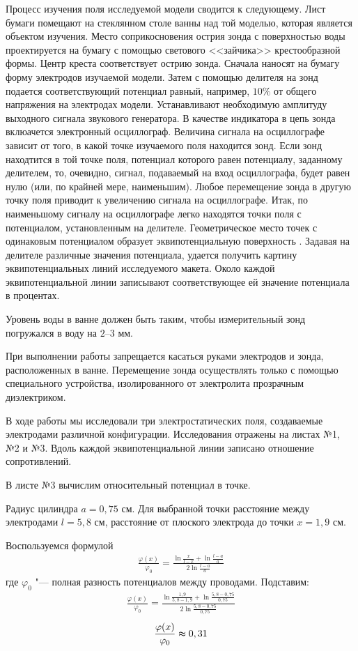 Процесс изучения поля исследуемой модели сводится к следующему. Лист бумаги помещают на стеклянном столе ванны над той моделью, которая является объектом изучения. Место соприкосновения острия зонда с поверхностью воды проектируется на бумагу с помощью светового <<зайчика>> крестообразной формы. Центр креста соответствует острию зонда. Сначала наносят на бумагу форму электродов изучаемой модели. Затем с помощью делителя на зонд подается соответствующий потенциал равный, например, $10\%$ от общего напряжения на электродах модели. Устанавливают необходимую амплитуду выходного сигнала звукового генератора. В качестве индикатора в цепь зонда вклюачется электронный осциллограф. Величина сигнала на осциллографе зависит от того, в какой точке изучаемого поля находится зонд. Если зонд находтится в той точке поля, потенциал которого равен потенциалу, заданному делителем, то, очевидно, сигнал, подаваемый на вход осциллографа, будет равен нулю (или, по крайней мере, наименьшим). Любое перемещение зонда в другую точку поля приводит к увеличению сигнала на осциллографе. Итак, по наименьшому сигналу на осциллографе легко находятся точки поля с потенциалом, установленным на делителе. Геометрическое место точек с одинаковым потенциалом образует эквипотенциальную поверхность . Задавая на делителе различные значения потенциала, удается получить картину эквипотенциальных линий исследуемого макета. Около каждой эквипотенциальной линии записывают соответствующее ей значение потенциала в процентах.

Уровень воды в ванне должен быть таким, чтобы измерительный зонд погружался в воду на $2$--$3$ мм.

При выполнении работы запрещается касаться руками электродов и зонда, расположенных в ванне. Перемещение зонда осуществлять только с помощью специального устройства, изолированного от электролита прозрачным диэлектриком.

В ходе работы мы исследовали три электростатических поля, создаваемые электродами различной конфигурации. Исследования отражены на листах №1, №2 и №3. Вдоль каждой эквипотенциальной линии записано отношение сопротивлений.

В листе №3 вычислим относительный потенциал в точке.

Радиус цилиндра $a = 0,75$ см. Для выбранной точки расстояние между электродами $l = 5,8$ см, расстояние от плоского электрода до точки $x = 1,9$ см.

Воспользуемся формулой 
\begin{align*}
  \frac{\varphi(x)}{\varphi_0} = \frac{\ln{\frac{x}{l - x}} + \ln{\frac{l - a}{a}}}{2\ln{\frac{l - a}{a}}}
\end{align*}
где $\varphi_0$ "--- полная разность потенциалов между проводами.
Подставим:
\begin{align*}
  \frac{\varphi(x)}{\varphi_0} = \frac{\ln{\frac{1,9}{5,8 - 1,9}} + \ln{\frac{5,8 - 0,75}{0,75}}}{2\ln{\frac{5,8 - 0,75}{0,75}}}
\end{align*}
$$
\frac{\varphi(x)}{\varphi_0} \thickapprox 0,31
$$

